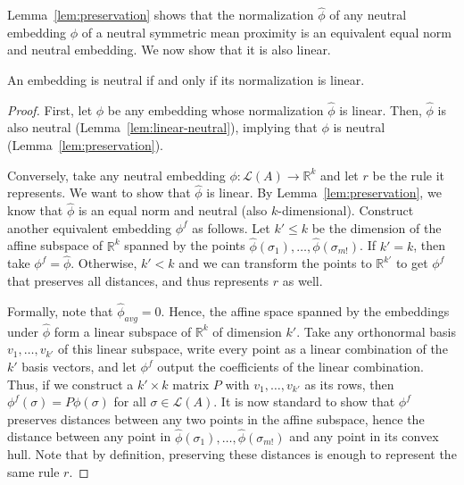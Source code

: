 \documentclass[prodmode,acmec]{ec-acmsmall}
\newcommand{\calL}{{\mathcal{L}}}
\newcommand{\rank}{{\calL(A)}}
\begin{document}
Lemma~\ref{lem:preservation} shows that the normalization $\hat{\phi}$ of any neutral embedding $\phi$ of a neutral symmetric mean proximity is an equivalent equal norm and neutral embedding. We now show that it is also linear.  


\begin{theorem}
An embedding is neutral if and only if its normalization is linear. 
\label{thm:neutral-linear}
\end{theorem}
\begin{proof}
First, let $\phi$ be any embedding whose normalization $\hat{\phi}$ is linear. Then, $\hat{\phi}$ is also neutral (Lemma~\ref{lem:linear-neutral}), implying that $\phi$ is neutral (Lemma~\ref{lem:preservation}).

Conversely, take any neutral embedding $\phi : \rank \rightarrow \mathbb{R}^k$ and let $r$ be the rule it represents. We want to show that $\hat{\phi}$ is linear. By Lemma~\ref{lem:preservation}, we know that $\hat{\phi}$ is an equal norm and neutral (also $k$-dimensional). Construct another equivalent embedding $\phi^f$ as follows. Let $k' \le k$ be the dimension of the affine subspace of $\mathbb{R}^k$ spanned by the points $\hat{\phi}(\sigma_1),\ldots,\hat{\phi}(\sigma_{m!})$. If $k' = k$, then take $\phi^f = \hat{\phi}$. Otherwise, $k' < k$ and we can transform the points to $\mathbb{R}^{k'}$ to get $\phi^f$ that preserves all distances, and thus represents $r$ as well. 

Formally, note that $\hat{\phi}_{avg} = 0$. Hence, the affine space spanned by the embeddings under $\hat{\phi}$ form a linear subspace of $\mathbb{R}^k$ of dimension $k'$. Take any orthonormal basis $v_1,\ldots,v_{k'}$ of this linear subspace, write every point as a linear combination of the $k'$ basis vectors, and let $\phi^f$ output the coefficients of the linear combination. Thus, if we construct a $k' \times k$ matrix $P$ with $v_1,\ldots,v_{k'}$ as its rows, then $\phi^f(\sigma) = P \phi(\sigma)$ for all $\sigma \in \rank$. It is now standard to show that $\phi^f$ preserves distances between any two points in the affine subspace, hence the distance between any point in $\hat{\phi}(\sigma_1),\ldots,\hat{\phi}(\sigma_{m!})$ and any point in its convex hull. Note that by definition, preserving these distances is enough to represent the same rule $r$. 


\end{proof}
\end{document}
